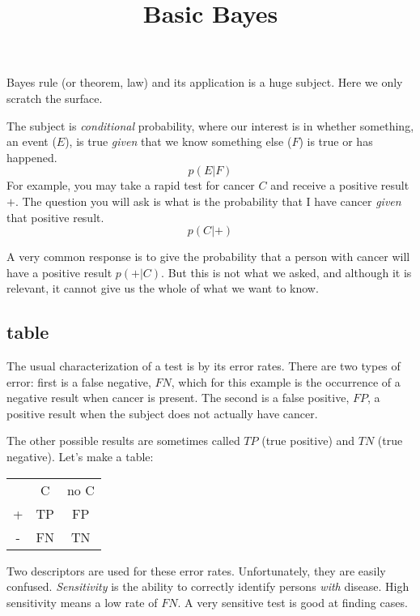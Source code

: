 \documentclass[11pt, oneside]{article}
\title{Basic Bayes}
\date{}
\begin{document}
\maketitle
\Large


Bayes rule (or theorem, law) and its application is a huge subject.  Here we only scratch the surface.  

The subject is \emph{conditional} probability, where our interest is in whether something, an event ($E$), is true \emph{given} that we know something else ($F$) is true or has happened.
\[ p(E | F) \]
For example, you may take a rapid test for cancer $C$ and receive a positive result $+$.  The question you will ask is what is the probability that I have cancer \emph{given} that positive result.
\[ p(C | +) \]

A very common response is to give the probability that a person with cancer will have a positive result $p(+ | C)$.  But this is not what we asked, and although it is relevant, it cannot give us the whole of what we want to know.

\subsection*{table}

The usual characterization of a test is by its error rates.  There are two types of error:  first is a false negative, $FN$, which for this example is the occurrence of a negative result when cancer is present.  The second is a false positive, $FP$, a positive result when the subject does not actually have cancer.

The other possible results are sometimes called $TP$ (true positive) and $TN$ (true negative).  Let's make a table:
\begin{center}
\begin{tabular}{ |c|c|c| } 
 \hline
   & C & no C \\ 
 + & TP & FP  \\ 
 - & FN & TN  \\  
 \hline
\end{tabular}
\end{center}

Two descriptors are used for these error rates.  Unfortunately, they are easily confused.  \emph{Sensitivity} is the ability to correctly identify persons \emph{with} disease.  High sensitivity means a low rate of $FN$.  A very sensitive test is good at finding cases.
\end{document}
